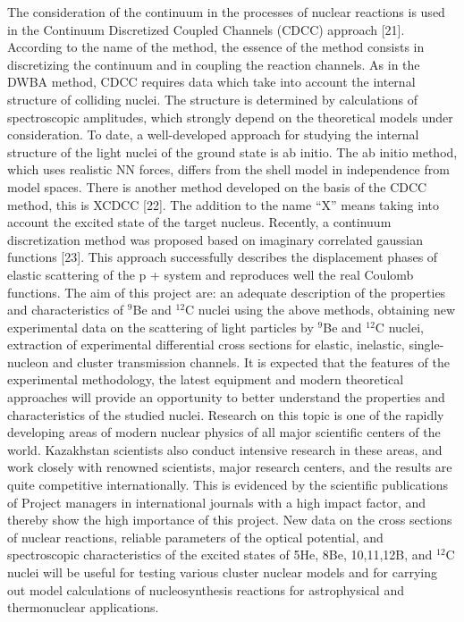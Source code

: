 \documentclass[
12pt, %
oneside, %
english, %
onehalfspacing, %
onehalfspacing, %
headsepline, %
]{MastersDoctoralThesis} %
\begin{document}
The consideration of the continuum in the processes of nuclear reactions is used in the Continuum Discretized Coupled Channels (CDCC) approach [21]. According to the name of the method, the essence of the method consists in discretizing the continuum and in coupling the reaction channels. As in the DWBA method, CDCC requires data which take into account the internal structure of colliding nuclei. The structure is determined by calculations of spectroscopic amplitudes, which strongly depend on the theoretical models under consideration. To date, a well-developed approach for studying the internal structure of the light nuclei of the ground state is ab initio. The ab initio method, which uses realistic NN forces, differs from the shell model in independence from model spaces. There is another method developed on the basis of the CDCC method, this is XCDCC [22]. The addition to the name “X” means taking into account the excited state of the target nucleus. Recently, a continuum discretization method was proposed based on imaginary correlated gaussian functions [23]. This approach successfully describes the displacement phases of elastic scattering of the p +  system and reproduces well the real Coulomb functions.
The aim of this project are: an adequate description of the properties and characteristics of $^{9}$Be and $^{12}$C nuclei using the above methods, obtaining new experimental data on the scattering of light particles by $^{9}$Be and $^{12}$C nuclei, extraction of experimental differential cross sections for elastic, inelastic, single-nucleon and cluster transmission channels. It is expected that the features of the experimental methodology, the latest equipment and modern theoretical approaches will provide an opportunity to better understand the properties and characteristics of the studied nuclei.
Research on this topic is one of the rapidly developing areas of modern nuclear physics of all major scientific centers of the world. Kazakhstan scientists also conduct intensive research in these areas, and work closely with renowned scientists, major research centers, and the results are quite competitive internationally. This is evidenced by the scientific publications of Project managers in international journals with a high impact factor, and thereby show the high importance of this project. New data on the cross sections of nuclear reactions, reliable parameters of the optical potential, and spectroscopic characteristics of the excited states of 5He, 8Be, 10,11,12B, and $^{12}$C nuclei will be useful for testing various cluster nuclear models and for carrying out model calculations of nucleosynthesis reactions for astrophysical and thermonuclear applications.
\end{document}
